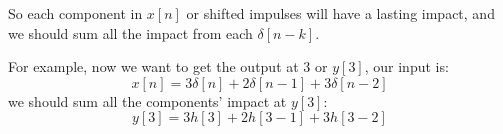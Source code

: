     So each component in $x[n]$ or shifted impulses will have a lasting impact, 
    and we should sum all the impact from each $\delta[n-k]$.

    For example, now we want to get the output at 3 or $y[3]$, our input is:
                    \begin{equation}
                        x[n] = 3\delta[n] + 2\delta[n-1] + 3\delta[n-2]
                    \end{equation}
    we should sum all the components' impact at $y[3]$:
                    \begin{equation}
                        y[3] = 3h[3] + 2h[3-1] + 3h[3-2]
                    \end{equation}

    
        



    
    
    
    





    
    
    
    
    
    
    
    
    
    
    
    


    
    
    
        
    




    





    

    
    

    

    
    
    